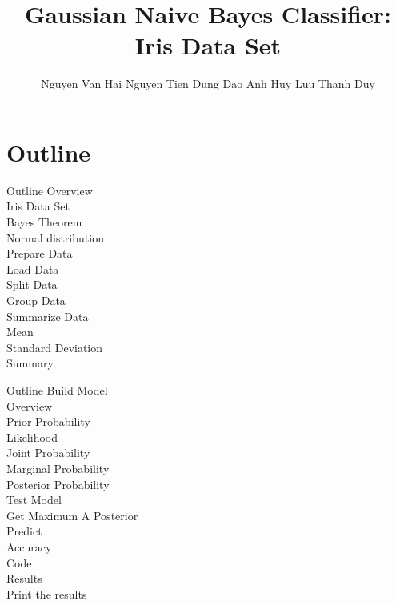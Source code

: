 \documentclass{beamer}
\title{Gaussian Naive Bayes Classifier: Iris Data Set}
\author{Nguyen Van Hai \break Nguyen Tien Dung \break Dao Anh Huy \break Luu Thanh Duy}
\institute{Ton Duc Thang University}
\date{} %
\begin{document}
{ 
\frame{\titlepage}}

\section*{Outline}
    \begin{frame}{Outline}
        Overview \\
            \hspace{1cm} Iris Data Set \\
            \hspace{1cm} Bayes Theorem \\
            \hspace{1cm} Normal distribution \\
        Prepare Data \\
            \hspace{1cm} Load Data \\
            \hspace{1cm} Split Data \\
            \hspace{1cm} Group Data \\
        Summarize Data \\
            \hspace{1cm} Mean \\
            \hspace{1cm} Standard Deviation \\
            \hspace{1cm} Summary \\
    \end{frame}

    \begin{frame}{Outline}
        Build Model \\
            \hspace{1cm} Overview \\
            \hspace{1cm} Prior Probability \\
            \hspace{1cm} Likelihood \\
            \hspace{1cm} Joint Probability \\
            \hspace{1cm} Marginal Probability \\
            \hspace{1cm} Posterior Probability \\
        Test Model \\
            \hspace{1cm} Get Maximum A Posterior \\
            \hspace{1cm} Predict \\
            \hspace{1cm} Accuracy \\
        Code \\
        Results \\
            \hspace{1cm}  Print the results\\
    \end{frame}
\end{document}
